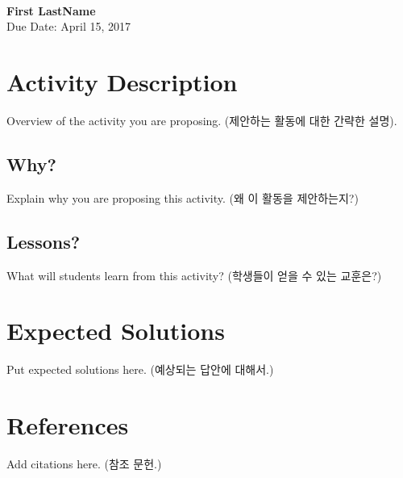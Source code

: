\documentclass[a4paper, 11pt]{article}
\begin{document}
 \\
         {\phantom{} \hfill \textbf{First LastName}} \\
         {\phantom{} \hfill Due Date: April 15, 2017} \\

\section{Activity Description}

Overview of the activity you are proposing.
(제안하는 활동에 대한 간략한 설명).

\subsection{Why?}

Explain why you are proposing this activity.
(왜 이 활동을 제안하는지?)

\subsection{Lessons?}

What will students learn from this activity?
(학생들이 얻을 수 있는 교훈은?)

\section{Expected Solutions}

Put expected solutions here.
(예상되는 답안에 대해서.)

\section{References}

Add citations here.
(참조 문헌.)
\end{document}
